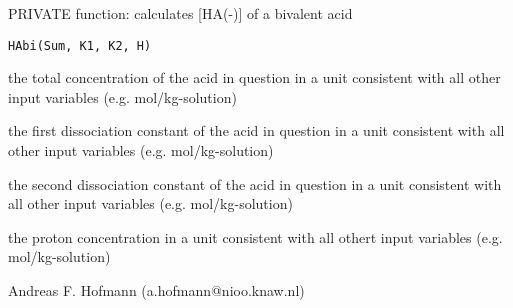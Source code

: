\documentclass{article}
\begin{document}
\begin{Description}\relax
PRIVATE function: calculates [HA(-)] of a bivalent acid
\end{Description}
\begin{Usage}
\begin{verbatim}HAbi(Sum, K1, K2, H)\end{verbatim}
\end{Usage}
\begin{Arguments}
\begin{ldescription}
\item[\code{Sum }] the total concentration of the acid in question in a unit consistent with all other input variables (e.g. mol/kg-solution)
\item[\code{K1 }] the first dissociation constant of the acid in question in a unit consistent with all other input variables (e.g. mol/kg-solution)
\item[\code{K2 }] the second dissociation constant of the acid in question in a unit consistent with all other input variables (e.g. mol/kg-solution)
\item[\code{H }] the proton concentration in a unit consistent with all othert input variables (e.g. mol/kg-solution)
\end{ldescription}
\end{Arguments}
\begin{Author}\relax
Andreas F. Hofmann (a.hofmann@nioo.knaw.nl)
\end{Author}
\end{document}
